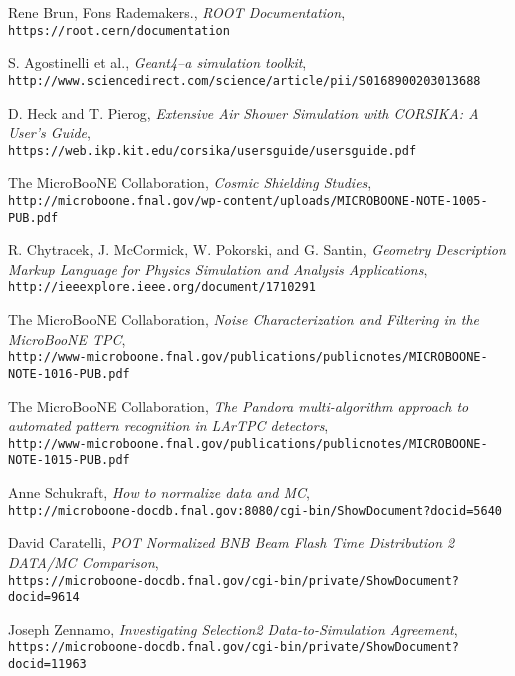 \begin{thebibliography}{20}
  Rene Brun, Fons Rademakers., \emph{ROOT Documentation}, \\
  \texttt{https://root.cern/documentation}
  
  S. Agostinelli et al., \emph{Geant4--a simulation toolkit},\\
  \texttt{http://www.sciencedirect.com/science/article/pii/S0168900203013688}
  
  D. Heck and T. Pierog, \emph{Extensive Air Shower Simulation with CORSIKA: A User's Guide},\\
  \texttt{https://web.ikp.kit.edu/corsika/usersguide/usersguide.pdf}
  

  The MicroBooNE Collaboration, \emph{Cosmic Shielding Studies},\\
  \texttt{http://microboone.fnal.gov/wp-content/uploads/MICROBOONE-NOTE-1005-PUB.pdf}
  
  
  R. Chytracek, J. McCormick, W. Pokorski, and G. Santin, \emph{Geometry Description Markup Language for Physics Simulation and Analysis Applications}, \\
  \texttt{http://ieeexplore.ieee.org/document/1710291}

  The MicroBooNE Collaboration, \emph{Noise Characterization and Filtering in the MicroBooNE TPC},\\
  \texttt{http://www-microboone.fnal.gov/publications/publicnotes/MICROBOONE-NOTE-1016-PUB.pdf}

  The MicroBooNE Collaboration, \emph{The Pandora multi-algorithm approach to automated pattern recognition in LArTPC detectors},\\
  \texttt{http://www-microboone.fnal.gov/publications/publicnotes/MICROBOONE-NOTE-1015-PUB.pdf}



 Anne Schukraft, \emph{How to normalize data and MC},\\
 \texttt{http://microboone-docdb.fnal.gov:8080/cgi-bin/ShowDocument?docid=5640}
 
  David Caratelli, \emph{POT Normalized BNB Beam Flash Time Distribution
2 DATA/MC Comparison},\\
  \texttt{https://microboone-docdb.fnal.gov/cgi-bin/private/ShowDocument?docid=9614}

  Joseph Zennamo, \emph{Investigating Selection2
Data-to-Simulation Agreement},\\
  \texttt{https://microboone-docdb.fnal.gov/cgi-bin/private/ShowDocument?docid=11963}


\end{thebibliography}
